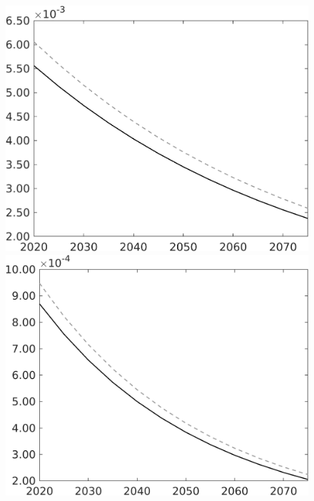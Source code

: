 \documentclass[12pt]{article}
\begin{document}
\begin{figure}[h!!]
\begin{minipage}[]{0.32\textwidth}
	\end{minipage}	
	\begin{minipage}[]{0.32\textwidth}
		\includegraphics[width=1\textwidth]{../../codding_model/own_basedOnFried/optimalPol_010922_revision/figures/all_13Sept22/CompTaul_LFBAU_Reg0_Lf_spillover0_nsk1_xgr0_knspil1_sep1_countec0_GovRev0_etaa0.79_lgd0.png}
	\end{minipage}	
	\begin{minipage}[]{0.32\textwidth}
		\includegraphics[width=1\textwidth]{../../codding_model/own_basedOnFried/optimalPol_010922_revision/figures/all_13Sept22/CompTaul_LFBAU_Reg0_Lg_spillover0_nsk1_xgr0_knspil1_sep1_countec0_GovRev0_etaa0.79_lgd0.png}

\end{minipage}
\end{figure}
\end{document}
